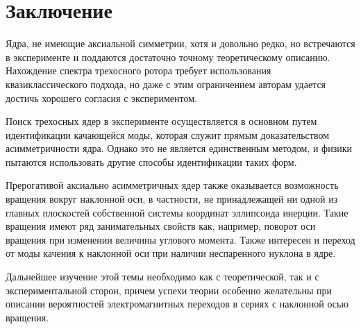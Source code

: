 \documentclass[a4paper, 10pt, twocolumn]{article}
\begin{document}

\section{Заключение}%

Ядра, не имеющие аксиальной симметрии, хотя и довольно редко, но 
встречаются в эксперименте и поддаются достаточно точному теоретическому 
описанию. Нахождение спектра трехосного ротора требует использования 
квазиклассического подхода, но даже с этим ограничением авторам удается 
достичь хорошего согласия с экспериментом.

Поиск трехосных ядер в эксперименте осуществляется в основном путем 
идентификации качающейся моды, которая служит прямым доказательством 
асимметричности ядра. Однако это не является единственным методом, 
и физики пытаются использовать другие способы идентификации таких форм.

Прерогативой аксиально асимметричных ядер также оказывается возможность 
вращения вокруг наклонной оси, в частности, не принадлежащей ни одной из 
главных плоскостей собственной системы координат эллипсоида инерции. 
Такие вращения имеют ряд занимательных свойств как, например, поворот 
оси вращения при изменении величины углового момента. Также интересен 
и переход от моды качения к наклонной оси при наличии неспаренного 
нуклона в ядре.

Дальнейшее изучение этой темы необходимо как с теоретической, так 
и с экспериментальной сторон, причем успехи теории особенно желательны 
при описании вероятностей электромагнитных переходов в сериях 
с наклонной осью вращения.

\end{document}
